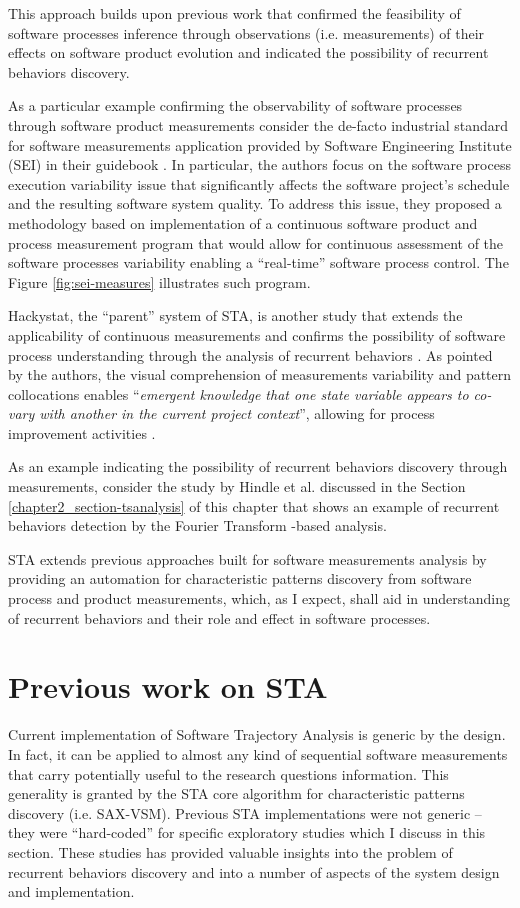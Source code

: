 This approach builds upon previous work that confirmed the feasibility of software processes inference through 
observations (i.e. measurements) of their effects on software product evolution and indicated the possibility of 
recurrent behaviors discovery. 

As a particular example confirming the observability of software processes through software product measurements 
consider the de-facto industrial standard for software measurements application provided by 
Software Engineering Institute (SEI) in their guidebook \cite{citeulike:10567306}. 
In particular, the authors focus on the software process execution variability issue that significantly 
affects the software project's schedule and the resulting software system quality. 
To address this issue, they proposed a methodology based on implementation of a continuous software product 
and process measurement program that would allow for continuous assessment of the software processes 
variability enabling a ``real-time'' software process control. 
The Figure \ref{fig:sei-measures} illustrates such program.

Hackystat, the ``parent'' system of STA, is another study that extends the applicability of continuous 
measurements and confirms the possibility of software process understanding through the analysis of recurrent 
behaviors \cite{citeulike:557296}. 
As pointed by the authors, the visual comprehension of measurements variability and pattern collocations enables 
``\textit{emergent knowledge that one state variable appears to co-vary with another in the current project context}'',
allowing for process improvement activities \cite{citeulike:557296}. 

As an example indicating the possibility of recurrent behaviors discovery through measurements, consider the 
study by Hindle et al. \cite{citeulike:10377345} discussed in the Section \ref{chapter2_section-tsanalysis} of 
this chapter that shows an example of recurrent behaviors detection by the Fourier Transform -based analysis.

STA extends previous approaches built for software measurements analysis by providing an automation for 
characteristic patterns discovery from software process and product measurements, which, as I expect, shall 
aid in understanding of recurrent behaviors and their role and effect in software processes.

\section{Previous work on STA}
Current implementation of Software Trajectory Analysis is generic by the design. In fact, it can be applied 
to almost any kind of sequential software measurements that carry potentially useful to the research 
questions information. 
This generality is granted by the STA core algorithm for characteristic patterns discovery (i.e. SAX-VSM). 
Previous STA implementations were not generic -- they were ``hard-coded'' for specific exploratory studies 
which I discuss in this section. These studies has provided valuable insights into the problem of recurrent 
behaviors discovery and into a number of aspects of the system design and implementation.

